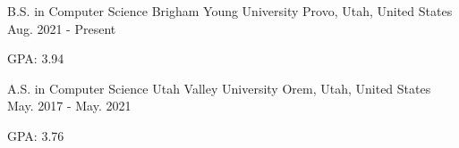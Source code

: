 

\begin{cventries}

  \cventry
    {B.S. in Computer Science} %
    {Brigham Young University} %
    {Provo, Utah, United States} %
    {Aug. 2021 - Present} %
    {
      \begin{cvitems} %
        \item {GPA: 3.94}
      \end{cvitems}
    }
  
  \cventry
    {A.S. in Computer Science} %
    {Utah Valley University} %
    {Orem, Utah, United States} %
    {May. 2017 - May. 2021} %
    {
      \begin{cvitems} %
        \item {GPA: 3.76}
      \end{cvitems}
    }

\end{cventries}

